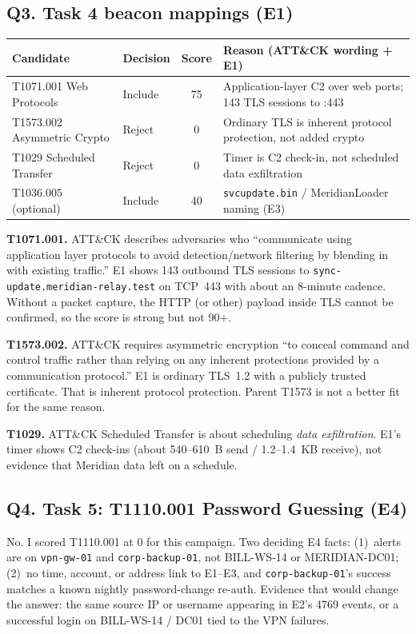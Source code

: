 \documentclass[11pt,letterpaper]{article}
\newcommand{\labstep}[1]{%
  \Needspace{6\baselineskip}%
  \subsection*{#1}%
  \nopagebreak
}
\begin{document}
\labstep{Q3. Task 4 beacon mappings (E1)}

\begin{tabularx}{\textwidth}{@{}l l c Y@{}}
\toprule
\textbf{Candidate} & \textbf{Decision} & \textbf{Score} & \textbf{Reason (ATT\&CK wording + E1)} \\
\midrule
T1071.001 Web Protocols & Include & 75 & Application-layer C2 over web ports; 143 TLS sessions to :443 \\
T1573.002 Asymmetric Crypto & Reject & 0 & Ordinary TLS is inherent protocol protection, not added crypto \\
T1029 Scheduled Transfer & Reject & 0 & Timer is C2 check-in, not scheduled data exfiltration \\
T1036.005 (optional) & Include & 40 & \texttt{svcupdate.bin} / MeridianLoader naming (E3) \\
\bottomrule
\end{tabularx}

\textbf{T1071.001.} ATT\&CK describes adversaries who ``communicate using application layer protocols to avoid detection/network filtering by blending in with existing traffic.'' E1 shows 143 outbound TLS sessions to \texttt{sync-update.meridian-relay.test} on TCP~443 with about an 8-minute cadence. Without a packet capture, the HTTP (or other) payload inside TLS cannot be confirmed, so the score is strong but not 90+.

\textbf{T1573.002.} ATT\&CK requires asymmetric encryption ``to conceal command and control traffic rather than relying on any inherent protections provided by a communication protocol.'' E1 is ordinary TLS~1.2 with a publicly trusted certificate. That is inherent protocol protection. Parent T1573 is not a better fit for the same reason.

\textbf{T1029.} ATT\&CK Scheduled Transfer is about scheduling \emph{data exfiltration}. E1's timer shows C2 check-ins (about 540--610~B send / 1.2--1.4~KB receive), not evidence that Meridian data left on a schedule.

\labstep{Q4. Task 5: T1110.001 Password Guessing (E4)}

No. I scored T1110.001 at 0 for this campaign. Two deciding E4 facts: (1)~alerts are on \texttt{vpn-gw-01} and \texttt{corp-backup-01}, not BILL-WS-14 or MERIDIAN-DC01; (2)~no time, account, or address link to E1--E3, and \texttt{corp-backup-01}'s success matches a known nightly password-change re-auth. Evidence that would change the answer: the same source IP or username appearing in E2's 4769 events, or a successful login on BILL-WS-14 / DC01 tied to the VPN failures.
\end{document}
